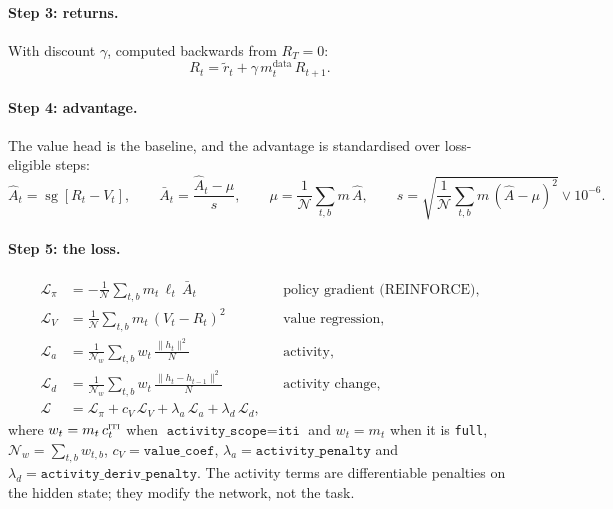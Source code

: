 \documentclass[11pt]{article}
\newcommand{\sg}{\operatorname{sg}}
\newcommand{\1}{\mathbf{1}}
\begin{document}
\paragraph{Step 3: returns.} With discount $\gamma$, computed backwards from $R_T = 0$:
\begin{equation}
  R_t = \tilde r_t + \gamma\, m^{\mathrm{data}}_t\, R_{t+1}.
\end{equation}

\paragraph{Step 4: advantage.} The value head is the baseline, and the advantage is
standardised over loss-eligible steps:
\begin{equation}
  \hat A_t = \sg\!\left[ R_t - V_t \right], \qquad
  \bar A_t = \frac{\hat A_t - \mu}{s}, \qquad
  \mu = \frac{1}{\mathcal{N}}\sum_{t,b} m\,\hat A, \qquad
  s = \sqrt{\frac{1}{\mathcal{N}}\sum_{t,b} m\,(\hat A - \mu)^2} \vee 10^{-6}.
\end{equation}

\paragraph{Step 5: the loss.}
\begin{align}
  \mathcal{L}_{\pi} &= -\frac{1}{\mathcal{N}} \sum_{t,b} m_t\, \ell_t\, \bar A_t
    && \text{policy gradient (REINFORCE)}, \\
  \mathcal{L}_{V} &= \frac{1}{\mathcal{N}} \sum_{t,b} m_t\, (V_t - R_t)^{2}
    && \text{value regression}, \\
  \mathcal{L}_{a} &= \frac{1}{\mathcal{N}_w} \sum_{t,b} w_t\, \frac{\|h_t\|^2}{N}
    && \text{activity}, \\
  \mathcal{L}_{d} &= \frac{1}{\mathcal{N}_w} \sum_{t,b} w_t\, \frac{\|h_t - h_{t-1}\|^2}{N}
    && \text{activity change}, \\[3pt]
  \mathcal{L} &= \mathcal{L}_{\pi} + c_V\,\mathcal{L}_{V}
                 + \lambda_a\,\mathcal{L}_{a} + \lambda_d\,\mathcal{L}_{d},
\end{align}
where $w_t = m_t\, c^{\textsc{iti}}_t$ when $\texttt{activity\_scope} = \texttt{iti}$ and
$w_t = m_t$ when it is \texttt{full}, $\mathcal{N}_w = \sum_{t,b} w_{t,b}$, $c_V =
\texttt{value\_coef}$, $\lambda_a = \texttt{activity\_penalty}$ and $\lambda_d =
\texttt{activity\_deriv\_penalty}$. The activity terms are differentiable penalties on
the hidden state; they modify the network, not the task.
\end{document}
